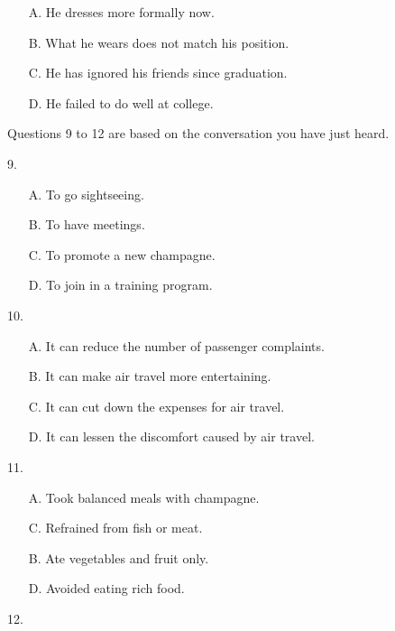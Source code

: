 \documentclass[UTF8,11pt]{ctexart}
\begin{document}
\begin{itemize}[leftmargin=2em,itemsep=.2em,topsep=.4em]\item[A.] He dresses more formally now.
\item[B.] What he wears does not match his position.
\item[C.] He has ignored his friends since graduation.
\item[D.] He failed to do well at college.
\end{itemize}

Questions 9 to 12 are based on the conversation you have just heard.


9.


\begin{itemize}[leftmargin=2em,itemsep=.2em,topsep=.4em]\item[A.] To go sightseeing.
\item[B.] To have meetings.
\item[C.] To promote a new champagne.
\item[D.] To join in a training program.
\end{itemize}

10.


\begin{itemize}[leftmargin=2em,itemsep=.2em,topsep=.4em]\item[A.] It can reduce the number of passenger complaints.
\item[B.] It can make air travel more entertaining.
\item[C.] It can cut down the expenses for air travel.
\item[D.] It can lessen the discomfort caused by air travel.
\end{itemize}

11.


\begin{itemize}[leftmargin=2em,itemsep=.2em,topsep=.4em]\item[A.] Took balanced meals with champagne.
\item[C.] Refrained from fish or meat.
\end{itemize}

\begin{itemize}[leftmargin=2em,itemsep=.2em,topsep=.4em]\item[B.] Ate vegetables and fruit only.
\item[D.] Avoided eating rich food.
\end{itemize}

12.
\end{document}
